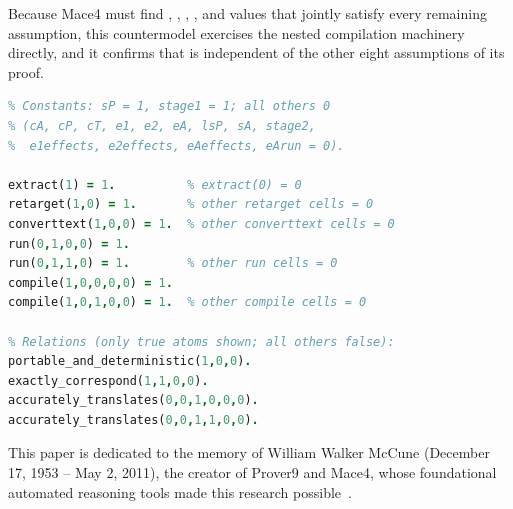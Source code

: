 Because Mace4 must find , , , , and  values that jointly satisfy every remaining assumption, this countermodel exercises the nested compilation machinery directly, and it confirms that  is independent of the other eight assumptions of its proof.

\begin{lstlisting}[language=Prolog, float=tb, label=lst:cp, caption={Satisfying model for cP-corresponds-sP (all-repeats-independence-1).}]
% Interpretation of size 2 {0,1}
% Constants: sP = 1, stage1 = 1; all others 0
% (cA, cP, cT, e1, e2, eA, lsP, sA, stage2,
%  e1effects, e2effects, eAeffects, eArun = 0).

extract(1) = 1.          % extract(0) = 0
retarget(1,0) = 1.       % other retarget cells = 0
converttext(1,0,0) = 1.  % other converttext cells = 0
run(0,1,0,0) = 1.
run(0,1,1,0) = 1.        % other run cells = 0
compile(1,0,0,0,0) = 1.
compile(1,0,1,0,0) = 1.  % other compile cells = 0

% Relations (only true atoms shown; all others false):
portable_and_deterministic(1,0,0).
exactly_correspond(1,1,0,0).
accurately_translates(0,0,1,0,0,0).
accurately_translates(0,0,1,1,0,0).
\end{lstlisting}

\begin{acks}
This paper is dedicated to the memory of William Walker McCune (December 17, 1953 -- May 2, 2011), the creator of Prover9 and Mace4, whose foundational automated reasoning tools made this research possible~\cite{bonacina2013automated}.
\end{acks}

